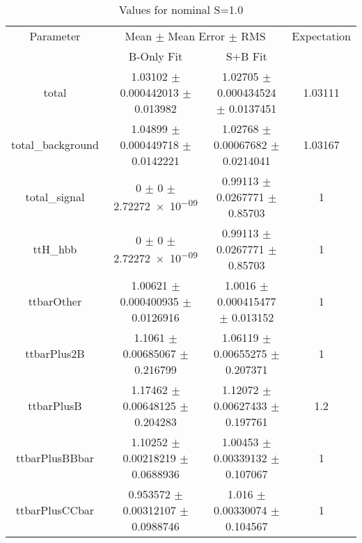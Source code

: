 \begin{table}
\centering
\caption{Values for nominal S=1.0}
\begin{tabular}{cccc}
\toprule
Parameter & \multicolumn{2}{c}{Mean $\pm$ Mean Error $\pm$ RMS} & Expectation\\
 & B-Only Fit & S+B Fit & \\
\midrule
total & \num{1.03102} $\pm$ \num{0.000442013} $\pm$ \num{0.013982} & \num{1.02705} $\pm$ \num{0.000434524} $\pm$ \num{0.0137451} & \num{1.03111}\\
total\_background & \num{1.04899} $\pm$ \num{0.000449718} $\pm$ \num{0.0142221} & \num{1.02768} $\pm$ \num{0.00067682} $\pm$ \num{0.0214041} & \num{1.03167}\\
total\_signal & \num{0} $\pm$ \num{0} $\pm$ \num{2.72272e-09} & \num{0.99113} $\pm$ \num{0.0267771} $\pm$ \num{0.85703} & \num{1}\\
ttH\_hbb & \num{0} $\pm$ \num{0} $\pm$ \num{2.72272e-09} & \num{0.99113} $\pm$ \num{0.0267771} $\pm$ \num{0.85703} & \num{1}\\
ttbarOther & \num{1.00621} $\pm$ \num{0.000400935} $\pm$ \num{0.0126916} & \num{1.0016} $\pm$ \num{0.000415477} $\pm$ \num{0.013152} & \num{1}\\
ttbarPlus2B & \num{1.1061} $\pm$ \num{0.00685067} $\pm$ \num{0.216799} & \num{1.06119} $\pm$ \num{0.00655275} $\pm$ \num{0.207371} & \num{1}\\
ttbarPlusB & \num{1.17462} $\pm$ \num{0.00648125} $\pm$ \num{0.204283} & \num{1.12072} $\pm$ \num{0.00627433} $\pm$ \num{0.197761} & \num{1.2}\\
ttbarPlusBBbar & \num{1.10252} $\pm$ \num{0.00218219} $\pm$ \num{0.0688936} & \num{1.00453} $\pm$ \num{0.00339132} $\pm$ \num{0.107067} & \num{1}\\
ttbarPlusCCbar & \num{0.953572} $\pm$ \num{0.00312107} $\pm$ \num{0.0988746} & \num{1.016} $\pm$ \num{0.00330074} $\pm$ \num{0.104567} & \num{1}\\
\bottomrule
\end{tabular}
\end{table}